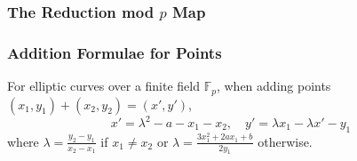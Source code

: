 \subsubsection{The Reduction mod $p$ Map}
\lipsum[1-3]
\subsubsection{Addition Formulae for Points}
For elliptic curves over a finite field $\mathbb{F}_p$, when adding points $(x_1,y_1) + (x_2,y_2) = (x',y')$,
$$x'=\lambda^2 - a - x_1 - x_2,\quad y' = \lambda x_1 -\lambda x' - y_1 $$
where $\lambda = \frac{y_2-y_1}{x_2-x_1}$ if $x_1\neq x_2$ or $\lambda=\frac{3x_1^2 + 2ax_1 + b}{2y_1}$ otherwise.
